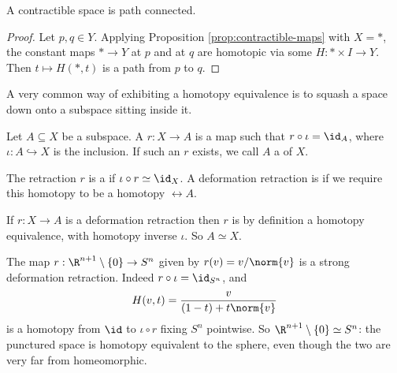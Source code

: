 \begin{corollary}
	A contractible space is path connected.
\end{corollary}
\begin{proof}
	Let $p, q \in Y$. Applying Proposition \ref{prop:contractible-maps} with $X = *$, the constant maps $* \to Y$ at $p$ and at $q$ are homotopic via some $H: * \times I \to Y$. Then $t \mapsto H(*, t)$ is a path from $p$ to $q$.
\end{proof}

A very common way of exhibiting a homotopy equivalence is to squash a space down onto a
subspace sitting inside it.

\begin{definition}[Retraction]
	Let $A \subseteq X$ be a subspace. A  $r:X \rightarrow A$ is a map such that $r \circ \iota = \id_A$, where $\iota: A \hookrightarrow X$ is the inclusion. If such an $r$ exists, we call $A$ a  of $X$.

	The retraction $r$ is a  if $\iota \circ r \simeq \id_X$. A deformation retraction is  if we require this homotopy to be a homotopy $\rel A$.
\end{definition}

If $r: X \to A$ is a deformation retraction then $r$ is by definition a homotopy
equivalence, with homotopy inverse $\iota$. So $A \simeq X$.

\begin{example} \label{ex:sdr-sphere}
	The map $r: \R^{n+1} \setminus \{0\} \to S^n$ given by $r(v) = v/\norm{v}$ is a strong deformation retraction. Indeed $r \circ \iota = \id_{S^n}$, and
	$$
	H(v, t) = \frac{v}{(1-t) + t\norm{v}}
	$$
	is a homotopy from $\id$ to $\iota \circ r$ fixing $S^n$ pointwise. So $\R^{n+1} \setminus \{0\} \simeq S^n$: the punctured space is homotopy equivalent to the sphere, even though the two are very far from homeomorphic.
\end{example}

\begin{center}
\end{center}

